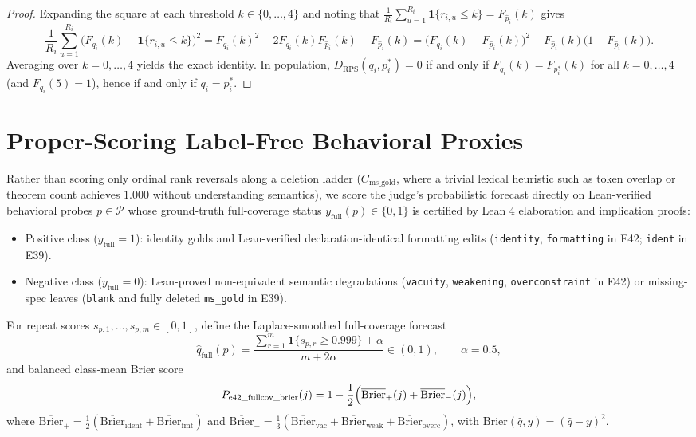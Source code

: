 \documentclass[11pt]{article}
\begin{document}
\begin{proof}
Expanding the square at each threshold $k \in \{0,\dots,4\}$ and noting that $\frac{1}{R_i}\sum_{u=1}^{R_i} \mathbf{1}\{r_{i,u}\le k\} = F_{\hat p_i}(k)$ gives
\[
\frac{1}{R_i}\sum_{u=1}^{R_i}\bigl(F_{q_i}(k) - \mathbf{1}\{r_{i,u}\le k\}\bigr)^2
= F_{q_i}(k)^2 - 2 F_{q_i}(k) F_{\hat p_i}(k) + F_{\hat p_i}(k)
= \bigl(F_{q_i}(k) - F_{\hat p_i}(k)\bigr)^2 + F_{\hat p_i}(k)\bigl(1 - F_{\hat p_i}(k)\bigr).
\]
Averaging over $k=0,\dots,4$ yields the exact identity. In population, $D_{\mathrm{RPS}}(q_i, p^*_i) = 0$ if and only if $F_{q_i}(k) = F_{p^*_i}(k)$ for all $k=0,\dots,4$ (and $F_{q_i}(5)=1$), hence if and only if $q_i = p^*_i$.
\end{proof}

\section{Proper-Scoring Label-Free Behavioral Proxies}

Rather than scoring only ordinal rank reversals along a deletion ladder ($C_{\mathrm{ms\_gold}}$, where a trivial lexical heuristic such as token overlap or theorem count achieves $1.000$ without understanding semantics), we score the judge's probabilistic forecast directly on Lean-verified behavioral probes $p \in \mathcal{P}$ whose ground-truth full-coverage status $y_{\mathrm{full}}(p) \in \{0,1\}$ is certified by Lean 4 elaboration and implication proofs:
\begin{itemize}
\item Positive class ($y_{\mathrm{full}} = 1$): identity golds and Lean-verified declaration-identical formatting edits (\texttt{identity}, \texttt{formatting} in E42; \texttt{ident} in E39).
\item Negative class ($y_{\mathrm{full}} = 0$): Lean-proved non-equivalent semantic degradations (\texttt{vacuity}, \texttt{weakening}, \texttt{overconstraint} in E42) or missing-spec leaves (\texttt{blank} and fully deleted \texttt{ms\_gold} in E39).
\end{itemize}
For repeat scores $s_{p,1},\dots,s_{p,m} \in [0,1]$, define the Laplace-smoothed full-coverage forecast
\begin{equation}
\hat q_{\mathrm{full}}(p) = \frac{\sum_{r=1}^m \mathbf{1}\{s_{p,r} \ge 0.999\} + \alpha}{m + 2\alpha} \in (0, 1), \qquad \alpha = 0.5,
\end{equation}
and balanced class-mean Brier score
\begin{equation}
P_{\mathrm{e42\_fullcov\_brier}}(j) = 1 - \frac{1}{2}\Bigl(\overline{\mathrm{Brier}}_{+}(j) + \overline{\mathrm{Brier}}_{-}(j)\Bigr),
\end{equation}
where $\overline{\mathrm{Brier}}_{+} = \frac{1}{2}(\overline{\mathrm{Brier}}_{\mathrm{ident}} + \overline{\mathrm{Brier}}_{\mathrm{fmt}})$ and $\overline{\mathrm{Brier}}_{-} = \frac{1}{3}(\overline{\mathrm{Brier}}_{\mathrm{vac}} + \overline{\mathrm{Brier}}_{\mathrm{weak}} + \overline{\mathrm{Brier}}_{\mathrm{overc}})$, with $\mathrm{Brier}(\hat q, y) = (\hat q - y)^2$.
\end{document}

